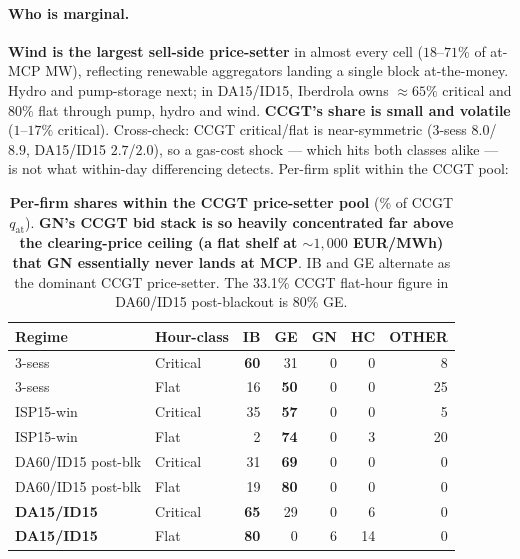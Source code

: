 \documentclass[11pt,a4paper]{article}
\begin{document}
\paragraph{Who is marginal.} \textbf{Wind is the largest sell-side price-setter} in almost every cell ($18$--$71\%$ of at-MCP MW), reflecting renewable aggregators landing a single block at-the-money. Hydro and pump-storage next; in DA15/ID15, Iberdrola owns $\approx\!65\%$ critical and $80\%$ flat through pump, hydro and wind. \textbf{CCGT's share is small and volatile} ($1$--$17\%$ critical). Cross-check: CCGT critical/flat is near-symmetric (3-sess $8.0$/$8.9$, DA15/ID15 $2.7$/$2.0$), so a gas-cost shock --- which hits both classes alike --- is not what within-day differencing detects. Per-firm split within the CCGT pool:

\begin{table}[H]
\centering\scriptsize
\setlength{\tabcolsep}{5pt}
\begin{tabular}{l l r r r r r}
\toprule
Regime & Hour-class & IB & GE & GN & HC & OTHER \\
\midrule
3-sess & Critical & \textbf{60} & 31 & 0 & 0 & 8 \\
3-sess & Flat & 16 & \textbf{50} & 0 & 0 & 25 \\
ISP15-win & Critical & 35 & \textbf{57} & 0 & 0 & 5 \\
ISP15-win & Flat & 2 & \textbf{74} & 0 & 3 & 20 \\
DA60/ID15 post-blk & Critical & 31 & \textbf{69} & 0 & 0 & 0 \\
DA60/ID15 post-blk & Flat & 19 & \textbf{80} & 0 & 0 & 0 \\
\textbf{DA15/ID15} & Critical & \textbf{65} & 29 & 0 & 6 & 0 \\
\textbf{DA15/ID15} & Flat & \textbf{80} & 0 & 6 & 14 & 0 \\
\bottomrule
\end{tabular}
\caption{\textbf{Per-firm shares within the CCGT price-setter pool} (\% of CCGT $q_{\text{at}}$). \textbf{GN's CCGT bid stack is so heavily concentrated far above the clearing-price ceiling (a flat shelf at $\sim\!1{,}000$ EUR/MWh) that GN essentially never lands at MCP}. IB and GE alternate as the dominant CCGT price-setter. The 33.1\% CCGT flat-hour figure in DA60/ID15 post-blackout is 80\% GE.}
\label{tab:ccgt_by_firm}
\end{table}
\end{document}
